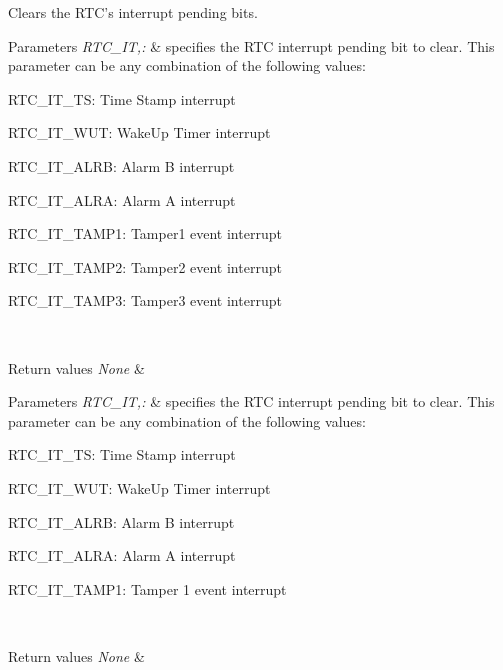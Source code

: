 Clears the R\-T\-C's interrupt pending bits. 


\begin{DoxyParams}{Parameters}
{\em R\-T\-C\-\_\-\-I\-T,\-:} & specifies the R\-T\-C interrupt pending bit to clear. This parameter can be any combination of the following values\-: \begin{DoxyItemize}
\item R\-T\-C\-\_\-\-I\-T\-\_\-\-T\-S\-: Time Stamp interrupt \item R\-T\-C\-\_\-\-I\-T\-\_\-\-W\-U\-T\-: Wake\-Up Timer interrupt \item R\-T\-C\-\_\-\-I\-T\-\_\-\-A\-L\-R\-B\-: Alarm B interrupt \item R\-T\-C\-\_\-\-I\-T\-\_\-\-A\-L\-R\-A\-: Alarm A interrupt \item R\-T\-C\-\_\-\-I\-T\-\_\-\-T\-A\-M\-P1\-: Tamper1 event interrupt \item R\-T\-C\-\_\-\-I\-T\-\_\-\-T\-A\-M\-P2\-: Tamper2 event interrupt \item R\-T\-C\-\_\-\-I\-T\-\_\-\-T\-A\-M\-P3\-: Tamper3 event interrupt \end{DoxyItemize}
\\
\hline
\end{DoxyParams}

\begin{DoxyRetVals}{Return values}
{\em None} & \\
\hline
\end{DoxyRetVals}

\begin{DoxyParams}{Parameters}
{\em R\-T\-C\-\_\-\-I\-T,\-:} & specifies the R\-T\-C interrupt pending bit to clear. This parameter can be any combination of the following values\-: \begin{DoxyItemize}
\item R\-T\-C\-\_\-\-I\-T\-\_\-\-T\-S\-: Time Stamp interrupt \item R\-T\-C\-\_\-\-I\-T\-\_\-\-W\-U\-T\-: Wake\-Up Timer interrupt \item R\-T\-C\-\_\-\-I\-T\-\_\-\-A\-L\-R\-B\-: Alarm B interrupt \item R\-T\-C\-\_\-\-I\-T\-\_\-\-A\-L\-R\-A\-: Alarm A interrupt \item R\-T\-C\-\_\-\-I\-T\-\_\-\-T\-A\-M\-P1\-: Tamper 1 event interrupt \end{DoxyItemize}
\\
\hline
\end{DoxyParams}

\begin{DoxyRetVals}{Return values}
{\em None} & \\
\hline
\end{DoxyRetVals}


